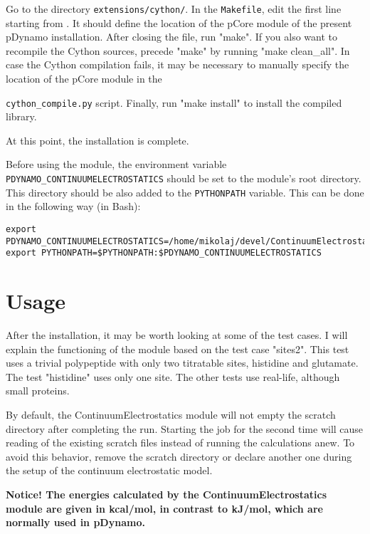 \documentclass[a4paper,11pt]{article}
\newcommand{\modulename}{ContinuumElectrostatics\xspace}
\begin{document}
\bigskip
Go to the directory \texttt{extensions/cython/}.
%
In the \texttt{Makefile}, edit the first line starting from .
%
It should define the location of the pCore module of the present pDynamo installation.
%
After closing the file, run "make".
%
If you also want to recompile the Cython sources, precede "make" by running "make clean\_all". 
%
In case the Cython compilation fails, it may be necessary to manually specify the location of the pCore module in the {\texttt{cython\_compile.py} script.
%
Finally, run "make install" to install the compiled library.

\bigskip
At this point, the installation is complete.

\bigskip
Before using the module, the environment variable \texttt{PDYNAMO\_CONTINUUMELECTROSTATICS} 
should be set to the module's root directory.
%
This directory should be also added to the \texttt{PYTHONPATH} variable. 
%
This can be done in the following way (in Bash):

\newpage
{\footnotesize \begin{lstlisting}
export PDYNAMO_CONTINUUMELECTROSTATICS=/home/mikolaj/devel/ContinuumElectrostatics
export PYTHONPATH=$PYTHONPATH:$PDYNAMO_CONTINUUMELECTROSTATICS
\end{lstlisting} }


\section{Usage}
After the installation, it may be worth looking at some of the test cases.
%
I will explain the functioning of the module based on the test case "sites2".
%
This test uses a trivial polypeptide with only two titratable sites,
histidine and glutamate.
%
The test "histidine" uses only one site. The other tests use real-life,
although small proteins.


By default, the \modulename module will not empty the scratch directory
after completing the run.
%
Starting the job for the second time will cause reading of the existing 
scratch files instead of running the calculations anew.
%
To avoid this behavior, remove the scratch directory or declare another one
during the setup of the continuum electrostatic model.

\textbf{Notice! The energies calculated by the \modulename module are 
given in kcal/mol, in contrast to kJ/mol, which are normally used 
in pDynamo.}


}
\end{document}
